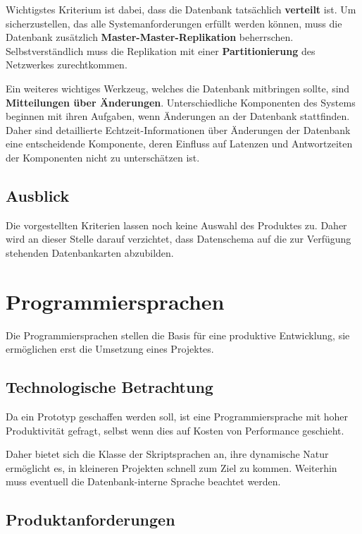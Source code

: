 Wichtigstes Kriterium ist dabei, dass die Datenbank tats\"achlich \textbf{verteilt} ist.
Um sicherzustellen, das alle Systemanforderungen erf\"ullt werden k\"onnen,
muss die Datenbank zus\"atzlich \textbf{Master-Master-Replikation} beherrschen.
Selbstverst\"andlich muss die Replikation mit einer \textbf{Partitionierung} des Netzwerkes zurechtkommen.

Ein weiteres wichtiges Werkzeug, welches die Datenbank mitbringen sollte, sind \textbf{Mitteilungen über Änderungen}.
Unterschiedliche Komponenten des Systems beginnen mit ihren Aufgaben,
wenn Änderungen an der Datenbank stattfinden.
Daher sind detaillierte Echtzeit-Informationen über Änderungen der Datenbank eine entscheidende Komponente,
deren Einfluss auf Latenzen und Antwortzeiten der Komponenten nicht zu unterschätzen ist.

\subsection{Ausblick}

Die vorgestellten Kriterien lassen noch keine Auswahl des Produktes zu.
Daher wird an dieser Stelle darauf verzichtet, dass Datenschema auf die zur Verfügung stehenden Datenbankarten abzubilden.

\section{Programmiersprachen}
\label{sec:tech:proglang}

Die Programmiersprachen stellen die Basis f\"ur eine produktive Entwicklung,
sie erm\"oglichen erst die Umsetzung eines Projektes.

\subsection{Technologische Betrachtung}

Da ein Prototyp geschaffen werden soll,
ist eine Programmiersprache mit hoher Produktivit\"at gefragt,
selbst wenn dies auf Kosten von Performance geschieht.

Daher bietet sich die Klasse der Skriptsprachen an,
ihre dynamische Natur ermöglicht es,
in kleineren Projekten schnell zum Ziel zu kommen.
Weiterhin muss eventuell die Datenbank-interne Sprache beachtet werden.


\subsection{Produktanforderungen}

